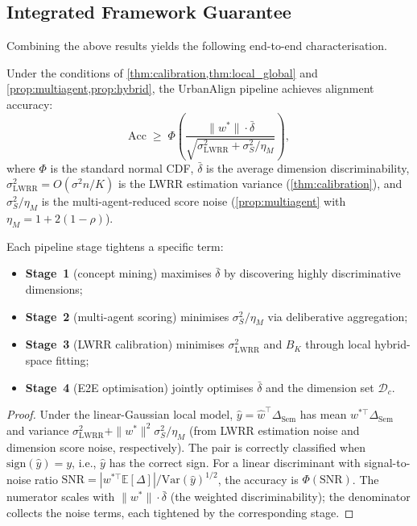 \documentclass[runningheads]{llncs}
\begin{document}
\subsection{Integrated Framework Guarantee}
\label{sec:theory_integrated}

Combining the above results yields the following end-to-end characterisation.

\begin{corollary}\label{cor:e2e}
Under the conditions of \cref{thm:calibration,thm:local_global} and \cref{prop:multiagent,prop:hybrid}, the UrbanAlign pipeline achieves alignment accuracy:
\begin{equation}
\mathrm{Acc} \;\geq\; \Phi\!\!\left(\frac{\|w^{*}\|\cdot\bar{\delta}}{\sqrt{\sigma_{\mathrm{LWRR}}^2 + \sigma_S^2/\eta_M}}\right),
\label{eq:integrated}
\end{equation}
where $\Phi$ is the standard normal CDF, $\bar{\delta}$ is the average dimension discriminability, $\sigma_{\mathrm{LWRR}}^2 = O(\sigma^2 n/K)$ is the LWRR estimation variance (\cref{thm:calibration}), and $\sigma_S^2/\eta_M$ is the multi-agent-reduced score noise (\cref{prop:multiagent} with $\eta_M = 1+2(1{-}\rho)$).

Each pipeline stage tightens a specific term:
\begin{itemize}
\item \textbf{Stage~1} (concept mining) maximises $\bar{\delta}$ by discovering highly discriminative dimensions;
\item \textbf{Stage~2} (multi-agent scoring) minimises $\sigma_S^2/\eta_M$ via deliberative aggregation;
\item \textbf{Stage~3} (LWRR calibration) minimises $\sigma_{\mathrm{LWRR}}^2$ and $B_K$ through local hybrid-space fitting;
\item \textbf{Stage~4} (E2E optimisation) jointly optimises $\bar{\delta}$ and the dimension set $\mathcal{D}_c$.
\end{itemize}
\end{corollary}

\begin{proof}
Under the linear-Gaussian local model, $\hat{y} = \hat{w}^{\!\top}\Delta_{\text{Sem}}$ has mean $w^{*\!\top}\Delta_{\text{Sem}}$ and variance $\sigma_{\mathrm{LWRR}}^2 + \|w^{*}\|^2\sigma_S^2/\eta_M$ (from LWRR estimation noise and dimension score noise, respectively).
The pair is correctly classified when $\mathrm{sign}(\hat{y}) = y$, i.e., $\hat{y}$ has the correct sign.
For a linear discriminant with signal-to-noise ratio $\mathrm{SNR} = |w^{*\!\top}\mathbb{E}[\Delta]| / \mathrm{Var}(\hat{y})^{1/2}$, the accuracy is $\Phi(\mathrm{SNR})$.
The numerator scales with $\|w^{*}\|\cdot\bar{\delta}$ (the weighted discriminability); the denominator collects the noise terms, each tightened by the corresponding stage.
\end{proof}
\end{document}
